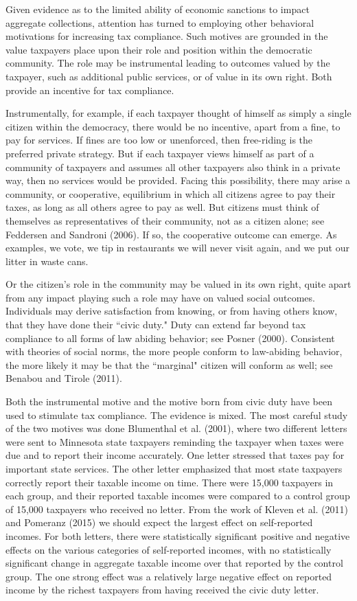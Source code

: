 \documentclass[12pt,titlepage]{article}
\begin{document}
Given evidence as to the limited ability of economic sanctions to
impact aggregate collections, attention has turned to employing
other  behavioral motivations for increasing tax
compliance.  Such motives are grounded in the value taxpayers place
upon their role and position within the democratic community.  The
role may be instrumental leading to outcomes valued by the taxpayer,
such as additional public services, or of value in its own right.
Both provide an incentive for tax compliance.

Instrumentally, for example, if each taxpayer thought of himself as
simply a single citizen within the democracy, there would be no
incentive, apart from a fine, to pay for services.  If fines are too
low or unenforced, then free-riding is the preferred private strategy.
But if each taxpayer views himself as part of a community of taxpayers
and assumes all other taxpayers also think in a private way, then no
services would be provided.  Facing this possibility, there may arise
a community, or cooperative, equilibrium in which all citizens agree
to pay their taxes, as long as all others agree to pay as well.  But
citizens must think of themselves as representatives of their
community, not as a citizen alone; see Feddersen and Sandroni (2006).
If so, the cooperative outcome can emerge.  As examples, we vote, we
tip in restaurants we will never visit again, and we put our litter in
waste cans.

Or the citizen's role in the community may be valued in its own right,
quite apart from any impact playing such a role may have on valued
social outcomes.  Individuals may derive satisfaction from knowing, or
from having others know, that they have done their ``civic duty."
Duty can extend far beyond tax compliance to all forms of law abiding
behavior; see Posner (2000).  Consistent with theories of social
norms, the more people conform to law-abiding behavior, the more
likely it may be that the ``marginal" citizen will conform as well;
see Benabou and Tirole (2011).

Both the instrumental motive and the motive born from civic duty have
been used to stimulate tax compliance.  The evidence is mixed.  The
most careful study of the two motives was done Blumenthal et
al. (2001), where two different letters were sent to Minnesota state
taxpayers reminding the taxpayer when taxes were due and to report
their income accurately.  One letter stressed that taxes pay for
important state services.  The other letter emphasized that most state
taxpayers correctly report their taxable income on time.  There were
15,000 taxpayers in each group, and their reported taxable incomes
were compared to a control group of 15,000 taxpayers who received no
letter.  From the work of Kleven et al. (2011) and Pomeranz (2015) we
should expect the largest effect on self-reported incomes.  For both
letters, there were statistically significant positive and negative
effects on the various categories of self-reported incomes, with no
statistically significant change in aggregate taxable income over that
reported by the control group.  The one strong effect was a relatively
large negative effect on reported income by the richest taxpayers from
having received the civic duty letter.
\end{document}
